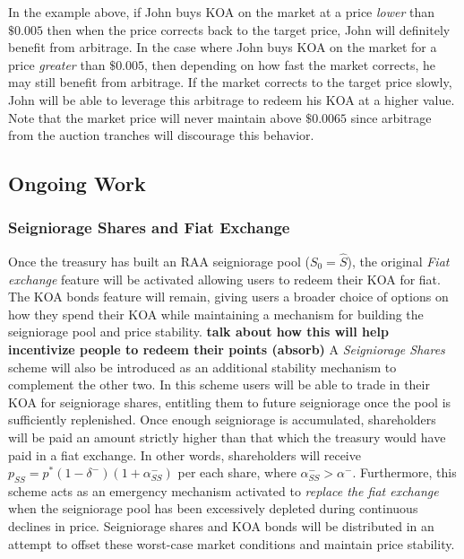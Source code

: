 In the example above, if John buys KOA on the market at a price \textit{lower} than $\$0.005$ then when the price corrects back to the target price, John will definitely benefit from arbitrage. In the case where John buys KOA on the market for a price \textit{greater} than $\$0.005$, then depending on how fast the market corrects, he may still benefit from arbitrage. If the market corrects to the target price slowly, John will be able to leverage this arbitrage to redeem his KOA at a higher value. Note that the market price will never maintain above $\$0.0065$ since arbitrage from the auction tranches will discourage this behavior. 


\subsection{Ongoing Work}

\subsubsection{Seigniorage Shares and Fiat Exchange}

Once the treasury has built an RAA seigniorage pool ($S_0 = \hat{S}$), the original \textit{Fiat exchange} feature will be activated allowing users to redeem their KOA for fiat. The KOA bonds feature will remain, giving users a broader choice of options on how they spend their KOA while maintaining a mechanism for building the seigniorage pool and price stability. \textbf{talk about how this will help incentivize people to redeem their points (absorb)} A \textit{Seigniorage Shares} scheme will also be introduced as an additional stability mechanism to complement the other two. In this scheme users will be able to trade in their KOA for seigniorage shares, entitling them to future seigniorage once the pool is sufficiently replenished. Once enough seigniorage is accumulated, shareholders will be paid an amount strictly higher than that which the treasury would have paid in a fiat exchange. In other words, shareholders will receive $p_{SS} = p^*(1-\delta^-)(1+\alpha^-_{SS})$ per each share, where $\alpha^-_{SS} > \alpha^-$. Furthermore, this scheme acts as an emergency mechanism activated to \textit{replace the fiat exchange} when the seigniorage pool has been excessively depleted during continuous declines in price. Seigniorage shares and KOA bonds will be distributed in an attempt to offset these worst-case market conditions and maintain price stability.

